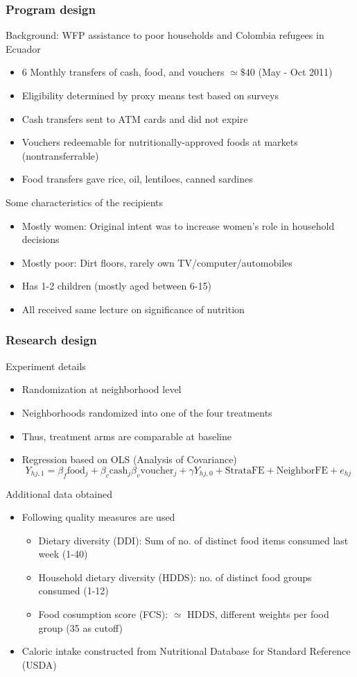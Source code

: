 \documentclass[aspectratio=169]{beamer}
\begin{document}
\begin{frame}
\frametitle{Program design} 
Background: WFP assistance to poor households and Colombia refugees in Ecuador
\begin{itemize}\setlength\itemsep{3pt}
\item 6 Monthly transfers of cash, food, and vouchers $\simeq\$40$ (May - Oct 2011)
\item Eligibility determined by proxy means test based on surveys
\item Cash transfers sent to ATM cards and did not expire
\item Vouchers redeemable for nutritionally-approved foods at markets (nontransferrable)
\item Food transfers gave rice, oil, lentiloes, canned sardines
\end{itemize}\medskip
Some characteristics of the recipients
\begin{itemize}\setlength\itemsep{3pt}
\item Mostly women: Original intent was to increase women's role in household decisions
\item Mostly poor: Dirt floors, rarely own TV/computer/automobiles
\item Has 1-2 children (mostly aged between 6-15)
\item All received same lecture on significance of nutrition
\end{itemize}
\end{frame}




\begin{frame}
\frametitle{Research design} 
Experiment details
\begin{itemize}\setlength\itemsep{3pt}
\item Randomization at neighborhood  level
\item Neighborhoods randomized into one of the four treatments
\item Thus, treatment arms are comparable at baseline 
\item Regression based on OLS (Analysis of Covariance)
\[
Y_{hj,1}=\beta_f\text{food}_j+\beta_c\text{cash}_j\beta_v\text{voucher}_j + \gamma Y_{hj,0} + \text{StrataFE} +\text{NeighborFE}+e_{hj}
\]
\end{itemize}\medskip
Additional data obtained
\begin{itemize}\setlength\itemsep{3pt}
\item Following quality measures are used
\begin{itemize}\setlength\itemsep{3pt}
\item Dietary diversity (DDI): Sum of no. of distinct food items consumed last week (1-40)
\item Household dietary diversity (HDDS): no. of distinct food groups consumed (1-12) 
\item Food cosumption score (FCS): $\simeq$ HDDS, different weights per food group (35 as cutoff)
\end{itemize}
\item Caloric intake constructed from Nutritional Database for Standard Reference (USDA)
\end{itemize}
\end{frame}
\end{document}
